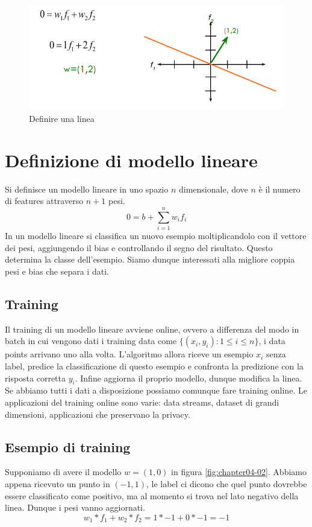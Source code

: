\begin{figure}
	\centering
	\includegraphics[width=0.6\linewidth]{imgs/chapter4/img0}
	\caption{Definire una linea}
	\label{fig:chapter04-00}
\end{figure}

\section{Definizione di modello lineare}
Si definisce un modello lineare in uno spazio $n$ dimensionale, dove $n$ \`e il numero di features attraverso $n+1$ pesi.
$$0=b+\sum\limits_{i=1}^nw_if_i$$
In un modello lineare si classifica un nuovo esempio moltiplicandolo con il vettore dei pesi, aggiungendo il bias e controllando il segno del risultato.
Questo determina la classe dell'esempio. Siamo dunque interessati alla migliore coppia pesi e bias che separa i dati.

	\subsection{Training}
	Il training di un modello lineare avviene online, ovvero a differenza del modo in batch in cui vengono dati i training data come $\{(x_i, y_i):1\le i\le n\}$, i data points arrivano uno alla volta.
	L'algoritmo allora riceve un esempio $x_i$ senza label, predice la classificazione di questo esempio e confronta la predizione con la risposta corretta $y_i$.
	Infine aggiorna il proprio modello, dunque modifica la linea. Se abbiamo tutti i dati a disposizione possiamo comunque fare training online.
	Le applicazioni del training online sono varie: data streams, dataset di grandi dimensioni, applicazioni che preservano la privacy.
	\subsection{Esempio di training}
	Supponiamo di avere il modello $w=(1,0)$ in figura \ref{fig:chapter04-02}. Abbiamo appena ricevuto un punto in $(-1,1)$, le label ci dicono che quel punto dovrebbe essere classificato come positivo, ma al momento si trova nel lato negativo della linea. Dunque i pesi vanno aggiornati.
	$$w_1*f_1 + w_2 * f_2 = 1 * -1 + 0 * -1 = -1$$
	
